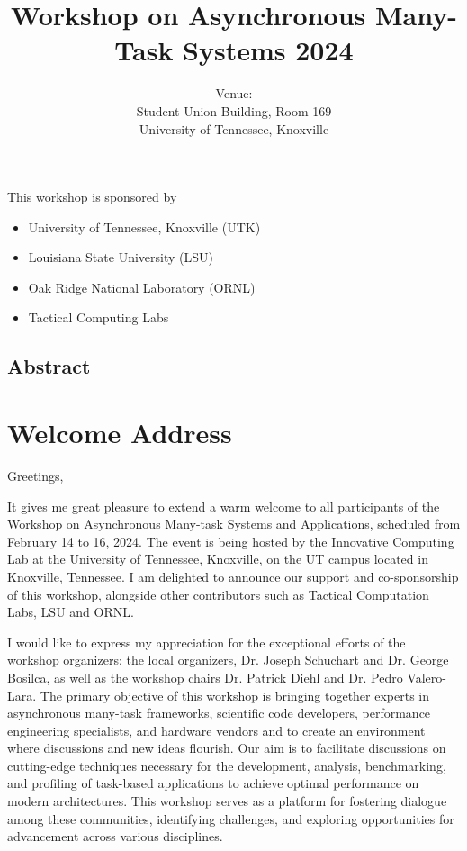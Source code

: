 \documentclass[12pt,letterpaper]{book}
\title{Workshop on Asynchronous Many-Task Systems 2024}
\author{Venue: \\ Student Union Building, Room 169\\University of Tennessee, Knoxville}
\begin{document}
\frontmatter

\maketitle

This workshop is sponsored by

\begin{itemize}
\item University of Tennessee, Knoxville (UTK)
\item Louisiana State University (LSU)
\item Oak Ridge National Laboratory (ORNL)
\item Tactical Computing Labs
\end{itemize}

\newpage

\section*{Abstract}


\chapter{Welcome Address}


Greetings,

\noindent It gives me great pleasure to extend a warm welcome to all participants
of the Workshop on Asynchronous Many-task Systems and Applications,
scheduled from February 14 to 16, 2024. The event is being hosted by the
Innovative Computing Lab at the University of Tennessee, Knoxville, on
the UT campus located in Knoxville, Tennessee. I am delighted to
announce our support and co-sponsorship of this workshop, alongside
other contributors such as Tactical Computation Labs, LSU and ORNL.

\noindent I would like to express my appreciation for the exceptional efforts of
the workshop organizers: the local organizers, Dr. Joseph Schuchart and
Dr. George Bosilca, as well as the workshop chairs Dr. Patrick Diehl and
Dr. Pedro Valero-Lara. The primary objective of this workshop is
bringing together experts in asynchronous many-task frameworks,
scientific code developers, performance engineering specialists, and
hardware vendors and to create an environment where discussions and new
ideas flourish. Our aim is to facilitate discussions on cutting-edge
techniques necessary for the development, analysis, benchmarking, and
profiling of task-based applications to achieve optimal performance on
modern architectures. This workshop serves as a platform for fostering
dialogue among these communities, identifying challenges, and exploring
opportunities for advancement across various disciplines.
\end{document}
